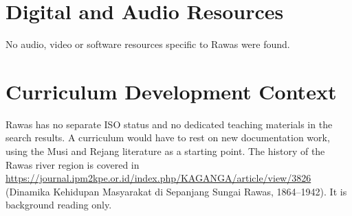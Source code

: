 \documentclass[12pt]{article}
\begin{document}
\section{Digital and Audio Resources}
No audio, video or software resources specific to Rawas were found.

\section{Curriculum Development Context}
Rawas has no separate ISO status and no dedicated teaching materials in the search results. A curriculum would have to rest on new documentation work, using the Musi and Rejang literature as a starting point. The history of the Rawas river region is covered in \url{https://journal.ipm2kpe.or.id/index.php/KAGANGA/article/view/3826} (Dinamika Kehidupan Masyarakat di Sepanjang Sungai Rawas, 1864--1942). It is background reading only.
\end{document}
